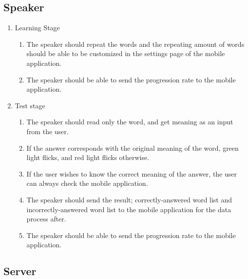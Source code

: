 \documentclass[conference]{IEEEtran}
\begin{document}
\subsection{Speaker}    
\begin{enumerate}
\item Learning Stage
    \begin{enumerate}
    \item The speaker should repeat the words and the repeating amount of words should be able to be customized in the settings page of the mobile application.
    \item The speaker should be able to send the progression rate to the mobile application.
    \end{enumerate}
\item Test stage
    \begin{enumerate}
    \item The speaker should read only the word, and get meaning as an input from the user.
    \item If the answer corresponds with the original meaning of the word, green light flicks, and red light flicks otherwise.
    \item If the user wishes to know the correct meaning of the answer, the user can always check the mobile application.
    \item The speaker should send the result; correctly-answered word list and incorrectly-answered word list to the mobile application for the data process after.
    \item The speaker should be able to send the progression rate to the mobile application.
    \end{enumerate}
\end{enumerate}

\subsection{Server}    
\end{document}

